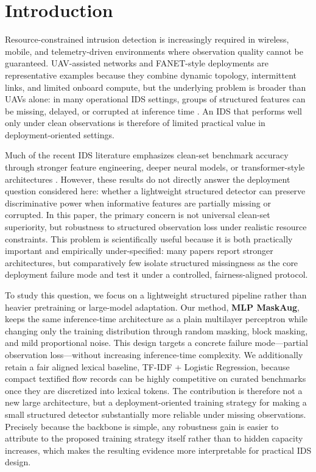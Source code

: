 

\section{Introduction}
Resource-constrained intrusion detection is increasingly required in wireless, mobile, and telemetry-driven environments where observation quality cannot be guaranteed. UAV-assisted networks and FANET-style deployments are representative examples because they combine dynamic topology, intermittent links, and limited onboard compute, but the underlying problem is broader than UAVs alone: in many operational IDS settings, groups of structured features can be missing, delayed, or corrupted at inference time \cite{uav_security_survey,fanet_security_survey,lightweight_ids_survey}. An IDS that performs well only under clean observations is therefore of limited practical value in deployment-oriented settings.

Much of the recent IDS literature emphasizes clean-set benchmark accuracy through stronger feature engineering, deeper neural models, or transformer-style architectures \cite{deep_ids_survey,transformer_ids_survey}. However, these results do not directly answer the deployment question considered here: whether a lightweight structured detector can preserve discriminative power when informative features are partially missing or corrupted. In this paper, the primary concern is not universal clean-set superiority, but robustness to structured observation loss under realistic resource constraints. This problem is scientifically useful because it is both practically important and empirically under-specified: many papers report stronger architectures, but comparatively few isolate structured missingness as the core deployment failure mode and test it under a controlled, fairness-aligned protocol.

To study this question, we focus on a lightweight structured pipeline rather than heavier pretraining or large-model adaptation. Our method, \textbf{MLP MaskAug}, keeps the same inference-time architecture as a plain multilayer perceptron while changing only the training distribution through random masking, block masking, and mild proportional noise. This design targets a concrete failure mode---partial observation loss---without increasing inference-time complexity. We additionally retain a fair aligned lexical baseline, TF-IDF + Logistic Regression, because compact textified flow records can be highly competitive on curated benchmarks once they are discretized into lexical tokens. The contribution is therefore not a new large architecture, but a deployment-oriented training strategy for making a small structured detector substantially more reliable under missing observations. Precisely because the backbone is simple, any robustness gain is easier to attribute to the proposed training strategy itself rather than to hidden capacity increases, which makes the resulting evidence more interpretable for practical IDS design.

